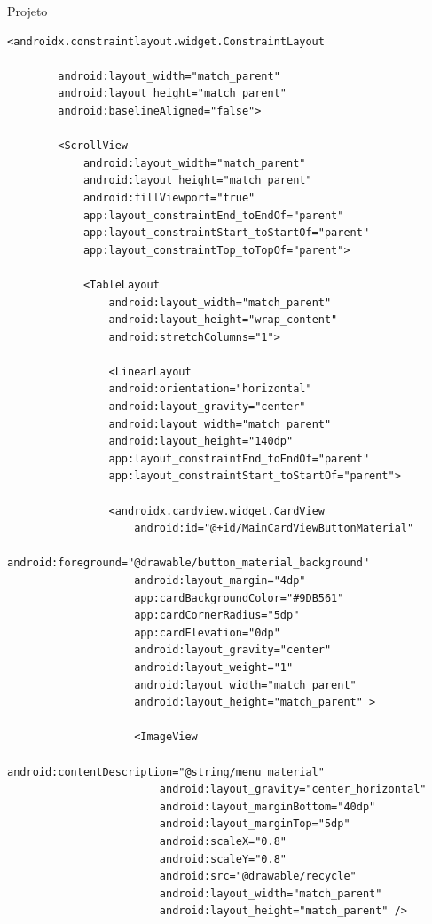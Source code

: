 \documentclass[
	12pt,				%
	openright,			%
	twoside,			%
	a4paper,			%
	english,			%
	french,				%
	spanish,			%
	brazil				%
	]{abntex2}
\begin{document}
\begin{chapter}{Projeto}
\begin{lstlisting}[numbers=none,
basicstyle=\small,
caption={Fragment Main.xml},
title={Fragment Main.xml},
xleftmargin=4pt,
label={fragment_main.xml}]
    <androidx.constraintlayout.widget.ConstraintLayout

        android:layout_width="match_parent"
        android:layout_height="match_parent"
        android:baselineAligned="false">

        <ScrollView
            android:layout_width="match_parent"
            android:layout_height="match_parent"
            android:fillViewport="true"
            app:layout_constraintEnd_toEndOf="parent"
            app:layout_constraintStart_toStartOf="parent"
            app:layout_constraintTop_toTopOf="parent">

            <TableLayout
                android:layout_width="match_parent"
                android:layout_height="wrap_content"
                android:stretchColumns="1">

                <LinearLayout
                android:orientation="horizontal"
                android:layout_gravity="center"
                android:layout_width="match_parent"
                android:layout_height="140dp"
                app:layout_constraintEnd_toEndOf="parent"
                app:layout_constraintStart_toStartOf="parent">

                <androidx.cardview.widget.CardView
                    android:id="@+id/MainCardViewButtonMaterial"
                    android:foreground="@drawable/button_material_background"
                    android:layout_margin="4dp"
                    app:cardBackgroundColor="#9DB561"
                    app:cardCornerRadius="5dp"
                    app:cardElevation="0dp"
                    android:layout_gravity="center"
                    android:layout_weight="1"
                    android:layout_width="match_parent"
                    android:layout_height="match_parent" >

                    <ImageView
                        android:contentDescription="@string/menu_material"
                        android:layout_gravity="center_horizontal"
                        android:layout_marginBottom="40dp"
                        android:layout_marginTop="5dp"
                        android:scaleX="0.8"
                        android:scaleY="0.8"
                        android:src="@drawable/recycle"
                        android:layout_width="match_parent"
                        android:layout_height="match_parent" />


\end{lstlisting}
\end{chapter}
\end{document}
